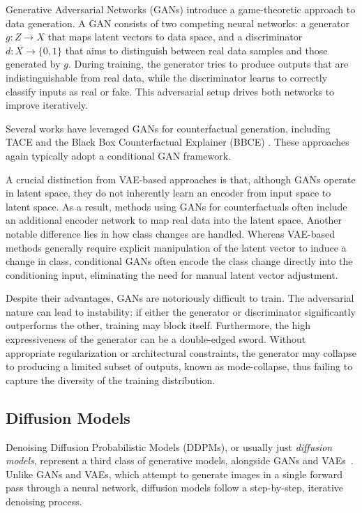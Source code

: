 Generative Adversarial Networks (GANs) \cite{goodfellow2020generative} introduce a game-theoretic approach to data generation.
A GAN consists of two competing neural networks: a generator $g : Z \to X$ that maps latent vectors to data space,
and a discriminator $d : X \to \{0,1\}$ that aims to distinguish between real data samples and those generated by $g$.
During training, the generator tries to produce outputs that are indistinguishable from real data, while the discriminator learns to correctly classify inputs as real or fake.
This adversarial setup drives both networks to improve iteratively.

Several works have leveraged GANs for counterfactual generation, including TACE \cite{rossi2024tace}
and the Black Box Counterfactual Explainer (BBCE) \cite{singla2023explaining}. These approaches again typically adopt a conditional GAN framework.

A crucial distinction from VAE-based approaches is that, although GANs operate in latent space, they do not inherently learn an encoder from input space to latent space.
As a result, methods using GANs for counterfactuals often include an additional encoder network to map real data into the latent space.
Another notable difference lies in how class changes are handled. Whereas VAE-based methods generally require explicit manipulation of the latent vector to induce a change in class,
conditional GANs often encode the class change directly into the conditioning input, eliminating the need for manual latent vector adjustment.

Despite their advantages, GANs are notoriously difficult to train. The adversarial nature can lead to instability: if either the generator or discriminator significantly outperforms the other, training may block itself.
Furthermore, the high expressiveness of the generator can be a double-edged sword. Without appropriate regularization or architectural constraints, the generator may collapse to producing a limited subset of outputs, known as mode-collapse, thus failing to capture the diversity of the training distribution.

\subsection{Diffusion Models}

Denoising Diffusion Probabilistic Models (DDPMs), or usually just \emph{diffusion models}, represent a third class of generative models, alongside GANs and VAEs~\cite{ho2020denoising}.
Unlike GANs and VAEs, which attempt to generate images in a single forward pass through a neural network, diffusion models follow a step-by-step, iterative denoising process.


